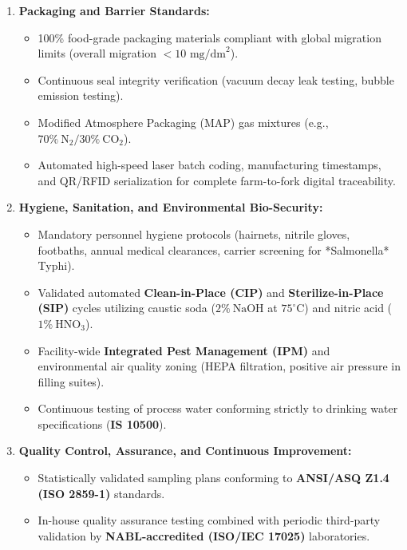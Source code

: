 \documentclass[11pt,a4paper,oneside]{article}
\begin{document}
\begin{enumerate}[leftmargin=*]
\begin{itemize}
        \item \textit{Sensory Profiling:} Mandatory organoleptic release panels verifying taste, aroma, mouthfeel, and texture against calibrated reference benchmarks.
    \end{itemize}
    \item \textbf{Packaging and Barrier Standards:}
    \begin{itemize}
        \item 100\% food-grade packaging materials compliant with global migration limits (overall migration $<10\text{ mg/dm}^2$).
        \item Continuous seal integrity verification (vacuum decay leak testing, bubble emission testing).
        \item Modified Atmosphere Packaging (MAP) gas mixtures (e.g., $70\%\ \mathrm{N_2} / 30\%\ \mathrm{CO_2}$).
        \item Automated high-speed laser batch coding, manufacturing timestamps, and QR/RFID serialization for complete farm-to-fork digital traceability.
    \end{itemize}
    \item \textbf{Hygiene, Sanitation, and Environmental Bio-Security:}
    \begin{itemize}
        \item Mandatory personnel hygiene protocols (hairnets, nitrile gloves, footbaths, annual medical clearances, carrier screening for *Salmonella* Typhi).
        \item Validated automated \textbf{Clean-in-Place (CIP)} and \textbf{Sterilize-in-Place (SIP)} cycles utilizing caustic soda ($2\%\ \mathrm{NaOH}$ at $75^\circ\text{C}$) and nitric acid ($1\%\ \mathrm{HNO_3}$).
        \item Facility-wide \textbf{Integrated Pest Management (IPM)} and environmental air quality zoning (HEPA filtration, positive air pressure in filling suites).
        \item Continuous testing of process water conforming strictly to drinking water specifications (\textbf{IS 10500}).
    \end{itemize}
    \item \textbf{Quality Control, Assurance, and Continuous Improvement:}
    \begin{itemize}
        \item Statistically validated sampling plans conforming to \textbf{ANSI/ASQ Z1.4 (ISO 2859-1)} standards.
        \item In-house quality assurance testing combined with periodic third-party validation by \textbf{NABL-accredited (ISO/IEC 17025)} laboratories.

\end{itemize}
\end{enumerate}
\end{document}
